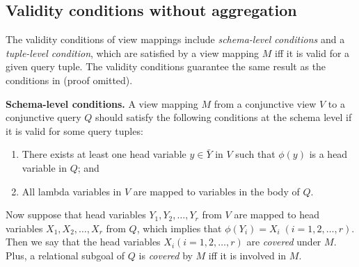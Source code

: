 \subsection{Validity conditions without aggregation}\label{valid_condition_no_agg}


The validity conditions of view mappings include {\em schema-level conditions} and a {\em tuple-level condition}, which are satisfied by a view mapping $M$ iff it is valid for a given query tuple. 
The validity conditions guarantee the same result as the conditions in \cite{wu2018data} (proof omitted).%

\begin{definition}\label{definition:token mapping}
{\bf Schema-level conditions.}
A view mapping $M$ from a conjunctive view $V$ to a conjunctive query $Q$ should satisfy the following conditions at the schema level if it is valid for some query tuples:
\begin{enumerate}
\item There exists at least one head variable $y \in \bar{Y}$ in $V$ such that $\phi(y)$ is a head variable in $Q$; and
\item All lambda variables in $V$ are mapped to variables in the body of $Q$.
\end{enumerate}
\end{definition}

Now suppose that head variables $Y_1, Y_2, \dots, Y_r$ from $V$ are mapped to head variables $X_1, X_2, \dots, X_r$ from $Q$, which implies that $\phi(Y_i) = X_i \;(i=1,2,\dots, r)$. Then we say that the head variables $X_i (i=1,2,\dots, r)$ are {\em covered} under $M$. Plus, a relational subgoal of $Q$ is {\em covered} by $M$ iff it is involved in $M$.


